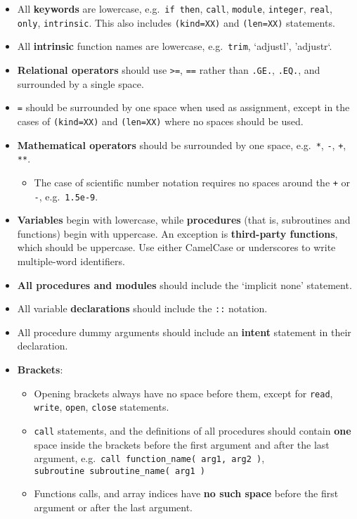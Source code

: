 \begin{itemize}
\item
  All \textbf{keywords} are lowercase, e.g.~\texttt{if\ then},
  \texttt{call}, \texttt{module}, \texttt{integer}, \texttt{real},
  \texttt{only}, \texttt{intrinsic}. This also includes
  \texttt{(kind=XX)} and \texttt{(len=XX)} statements.
\item
  All \textbf{intrinsic} function names are lowercase,
  e.g.~\texttt{trim}, `adjustl', 'adjustr`.
\item
  \textbf{Relational operators} should use \texttt{\textgreater{}=},
  \texttt{==} rather than \texttt{.GE.}, \texttt{.EQ.}, and surrounded
  by a single space.
\item
  \texttt{=} should be surrounded by one space when used as assignment,
  except in the cases of \texttt{(kind=XX)} and \texttt{(len=XX)} where
  no spaces should be used.
\item
  \textbf{Mathematical operators} should be surrounded by one space,
  e.g.~\texttt{*}, \texttt{-}, \texttt{+}, \texttt{**}.

  \begin{itemize}
    \item
    The case of scientific number notation requires no spaces around the
    \texttt{+} or \texttt{-}, e.g.~\texttt{1.5e-9}.
  \end{itemize}
\item
  \textbf{Variables} begin with lowercase, while \textbf{procedures}
  (that is, subroutines and functions) begin with uppercase. An
  exception is \textbf{third-party functions}, which should be
  uppercase. Use either CamelCase or underscores to write multiple-word
  identifiers.
\item
  \textbf{All procedures and modules} should include the `implicit none'
  statement.
\item
  All variable \textbf{declarations} should include the \texttt{::}
  notation.
\item
  All procedure dummy arguments should include an \textbf{intent}
  statement in their declaration.
\item
  \textbf{Brackets}:

  \begin{itemize}
    \item
    Opening brackets always have no space before them, except for
    \texttt{read}, \texttt{write}, \texttt{open}, \texttt{close}
    statements.
  \item
    \texttt{call} statements, and the definitions of all procedures
    should contain \textbf{one} space inside the brackets before the
    first argument and after the last argument,
    e.g.~\texttt{call\ function\_name(\ arg1,\ arg2\ )},
    \texttt{subroutine\ subroutine\_name(\ arg1\ )}
  \item
    Functions calls, and array indices have \textbf{no such space}
    before the first argument or after the last argument.
  \end{itemize}
\end{itemize}
